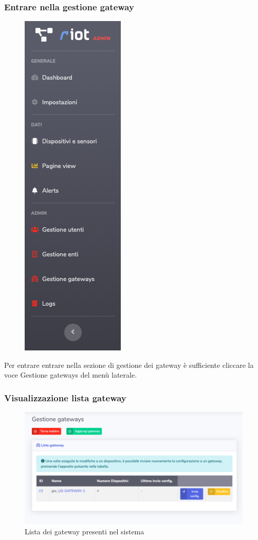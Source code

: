 	\subsubsection{Entrare nella gestione gateway}

		\begin{figure}[H]
		\centering
		\includegraphics[scale=0.600]{res/images/admin/menuGateway.png}
		\caption{}
	\end{figure}

		Per entrare entrare nella sezione di gestione dei gateway è sufficiente cliccare la voce Gestione gateways del menù laterale.

	\subsubsection{Visualizzazione lista gateway}

		\begin{figure}[H]
		\centering
		\includegraphics[scale=0.500]{res/images/admin/listaGateway.png}
		\caption{Lista dei gateway presenti nel sistema}
	\end{figure}

